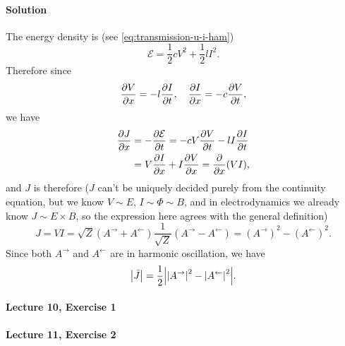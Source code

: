 \documentclass[hyperref, a4paper]{article}
\begin{document}
\paragraph{Solution} The energy density is (see \eqref{eq:transmission-u-i-ham})
\begin{equation}
    \mathcal{E} = \frac{1}{2} c V^2 + \frac{1}{2} l I^2.
\end{equation}
Therefore since 
\begin{equation}
    \pdv{V}{x} = - l \pdv{I}{t}, \quad 
    \pdv{I}{x} = - c \pdv{V}{t},
\end{equation}
we have
\[
    \begin{aligned}
        \pdv{J}{x} &= - \pdv{\mathcal{E}}{t} = - c V \pdv{V}{t} - l I \pdv{I}{t} \\
        &= V \pdv{I}{x} + I \pdv{V}{x} = \pdv{x} (VI),
    \end{aligned}
\]
and $J$ is therefore 
($J$ can't be uniquely decided purely from the continuity equation,
but we know $V \sim E$, $I \sim \Phi \sim B$, 
and in electrodynamics we already know $J \sim E \times B$,
so the expression here agrees with the general definition)
\begin{equation}
    J = VI = \sqrt{Z} (A^{\rightarrow} + A^{\leftarrow}) \frac{1}{\sqrt{Z}} (A^{\rightarrow} - A^{\leftarrow})
    = (A^{\rightarrow})^2 - (A^{\leftarrow})^2.
\end{equation}
Since both $A^{\rightarrow}$ and $A^{\leftarrow}$ are in harmonic oscillation,
we have 
\begin{equation}
    \abs{\bar{J}} = \frac{1}{2} \abs{ \abs{A^{\rightarrow}}^2 - \abs{A^{\leftarrow}}^2 }.
\end{equation}

\paragraph{Lecture 10, Exercise 1}

\paragraph{Lecture 11, Exercise 2}
\end{document}
